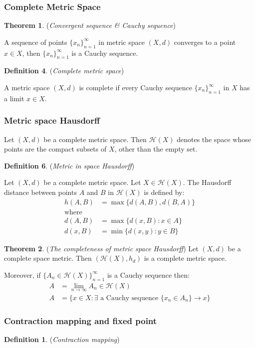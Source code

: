 \subsubsection{Complete Metric Space}
\textbf{Theorem 1}. (\textit{Convergent sequence \& Cauchy sequence})

A sequence of points \(\{x_n\}_{n=1}^\infty\) in metric space $(X, d)$ converges to a point \(x \in X\), then \(\{x_n\}_{n=1}^\infty\) is a Cauchy sequence.

\textbf{Definition 4}. (\textit{Complete metric space})

A metric space $(X, d)$ is complete if every Cauchy sequence \(\{x_n\}_{n=1}^\infty\) in \(X\) has a limit \(x \in X\).

\subsubsection{Metric space Hausdorff}
Let $(X, d)$ be a complete metric space. Then \(\mathcal{H}(X)\) denotes the space whose points are the compact subsets of \(X\), other than the empty set.

\textbf{Definition 6}. (\textit{Metric in space Hausdorff})

Let $(X, d)$ be a complete metric space. Let \(X \in \mathcal{H}(X)\). The Hausdorff distance between points \(A\) and \(B\) in \(\mathcal{H}(X)\) is defined by:
\begin{align*}
h(A, B) &= \max\{d(A, B), d(B, A)\}\\
\textrm{where }&\\
d(A, B) &= \max\{d(x, B) : x \in A\}\\
d(x, B) &= \min\{d(x, y) : y \in B\}
\end{align*}

\textbf{Theorem 2}. (\textit{The completeness of metric space Hausdorff})
Let $(X, d)$ be a complete space metric. Then \((\mathcal{H}(X), h_d)\) is a complete metric space. 

Moreover, if \(\{A_n \in \mathcal{H}(X)\}_{n=1}^\infty\) is a Cauchy sequence then:
\begin{align*}
    A &= \lim_{n \to \infty} A_n \in \mathcal{H}(X)\\
    A &= \{x \in X : \exists \text{ a Cauchy sequence } \{x_n \in A_n\} \rightarrow x\}
\end{align*}

\pagebreak
\subsubsection{Contraction mapping and fixed point}
\textbf{Definition 1}. (\textit{Contraction mapping})


